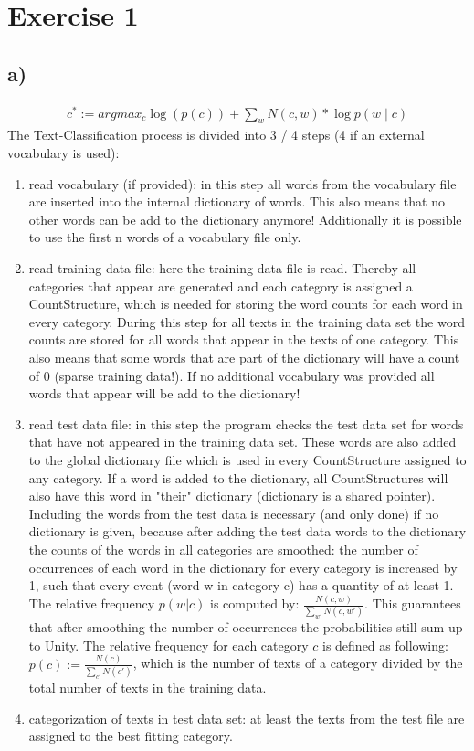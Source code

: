 \documentclass[12pt, a4paper, fleqn]{scrartcl}
\begin{document}
\section*{Exercise 1}
\subsection*{a)}
\begin{align*}
c^* := argmax_c {\log(p(c)) + \sum\limits_{w} N(c,w) * \log{p(w\mid c)}}
\end{align*}
The Text-Classification process is divided into 3 / 4 steps (4 if an external vocabulary is used):
\begin{enumerate}
\item read vocabulary (if provided): in this step all words from the vocabulary file are inserted into the internal dictionary of words. This also means that no other words can be add to the dictionary anymore! Additionally it is possible to use the first n words of a vocabulary file only.
\item read training data file: here the training data file is read. Thereby all categories that appear are generated and each category is assigned a CountStructure, which is needed for storing the word counts for each word in every category. During this step for all texts in the training data set the word counts are stored for all words that appear in the texts of one category. This also means that some words that are part of the dictionary will have a count of 0 (sparse training data!). If no additional vocabulary was provided all words that appear will be add to the dictionary!
\item read test data file: in this step the program checks the test data set for words that have not appeared in the training data set. These words are also added to the global dictionary file which is used in every CountStructure assigned to any category. If a word is added to the dictionary, all CountStructures will also have this word in "their" dictionary (dictionary is a shared pointer).
Including the words from the test data is necessary (and only done) if no dictionary is given, because after adding the test data words to the dictionary the counts of the words in all categories are smoothed: the number of occurrences of each word in the dictionary for every category is increased by 1, such that every event (word  w in category c) has a quantity of at least 1. The relative frequency $p(w | c)$ is computed by: $\frac{N(c, w)}{\sum\limits_{w'} N(c, w')}$. This guarantees that after smoothing the number of occurrences the probabilities still sum up to Unity. The relative frequency for each category $c$ is defined as following: $p(c) := \frac{N(c)}{\sum\limits_{c'} N(c')}$, which is the number of texts of a category divided by the total number of texts in the training data.
\item categorization of texts in test data set: at least the texts from the test file are assigned to the best fitting category.
\end{enumerate}
\end{document}
